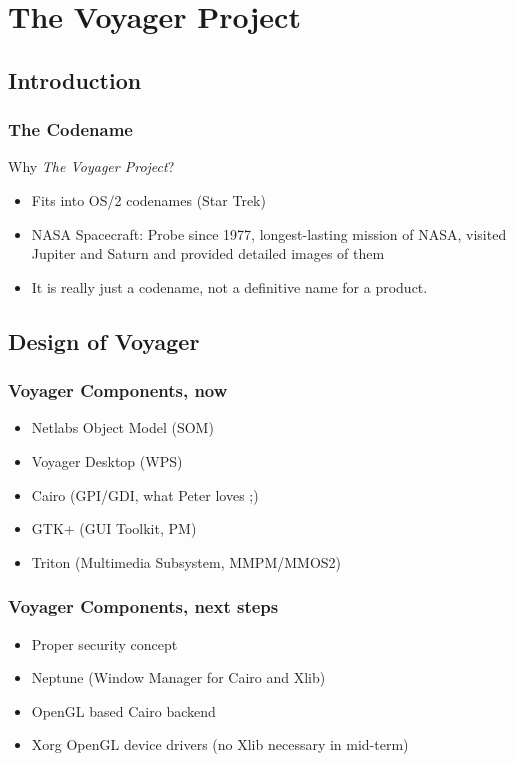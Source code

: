\documentclass{beamer}
\begin{document}
\section{The Voyager Project}
\subsection{Introduction}
\begin{frame}
\frametitle{The Codename}
Why \textit{The Voyager Project}?
\begin{itemize}[<+->]
  \item Fits into OS/2 codenames (Star Trek)
  \item NASA Spacecraft: Probe since 1977, longest-lasting mission of NASA,
  visited Jupiter and Saturn and provided detailed images of them
  \item It is really just a codename, not a definitive name for a product.
\end{itemize}
\end{frame}

\subsection{Design of Voyager}
\begin{frame}
\frametitle{Voyager Components, now}
\begin{itemize}[<+->]
  \item Netlabs Object Model (SOM)
  \item Voyager Desktop (WPS)
  \item Cairo (GPI/GDI, what Peter loves ;)
  \item GTK+ (GUI Toolkit, PM)
  \item Triton (Multimedia Subsystem, MMPM/MMOS2)
\end{itemize}
\end{frame}

\begin{frame}
\frametitle{Voyager Components, next steps}
\begin{itemize}[<+->]
  \item Proper security concept
  \item Neptune (Window Manager for Cairo and Xlib)
  \item OpenGL based Cairo backend
  \item Xorg OpenGL device drivers (no Xlib necessary in mid-term)
\end{itemize}
\end{frame}
\end{document}
